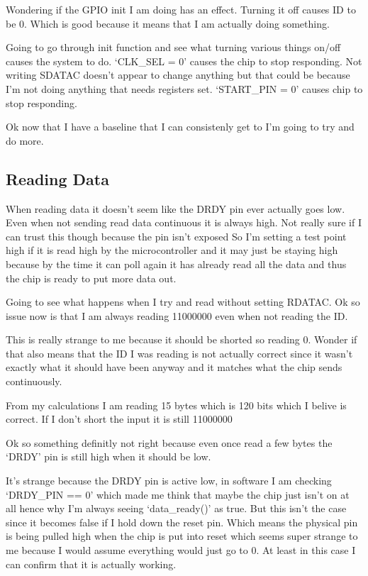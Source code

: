 Wondering if the GPIO init I am doing has an effect. Turning it off causes ID to be 0.
Which is good because it means that I am actually doing something.

Going to go through init function and see what turning various things on/off
causes the system to do.
`CLK\_SEL = 0' causes the chip to stop responding.
Not writing SDATAC doesn't appear to change anything but that could be because I'm not
doing anything that needs registers set.
`START\_PIN = 0' causes chip to stop responding.

Ok now that I have a baseline that I can consistenly get to I'm going to try and do more.


\subsection{Reading Data}
When reading data it doesn't seem like the DRDY pin ever actually goes low.
Even when not sending read data continuous it is always high.
Not really sure if I can trust this though because the pin isn't exposed
So I'm setting a test point high if it is read high by the microcontroller and it may
just be staying high because by the time it can poll again it has already read all the data
and thus the chip is ready to put more data out.

Going to see what happens when I try and read without setting RDATAC.
Ok so issue now is that I am always reading 11000000 even when not reading the ID.

This is really strange to me because it should be shorted so reading 0.
Wonder if that also means that the ID I was reading is not actually correct since it wasn't
exactly what it should have been anyway and it matches what the chip sends continuously.

From my calculations I am reading 15 bytes which is 120 bits which I belive is correct.
If I don't short the input it is still 11000000

Ok so something definitly not right because even once read a few bytes the `DRDY'
pin is still high when it should be low.

It's strange because the DRDY pin is active low, in software I am checking `DRDY\_PIN == 0'
which made me think that maybe the chip just isn't on at all hence why I'm always seeing
`data\_ready()' as true.
But this isn't the case since it becomes false if I hold down the reset pin.
Which means the physical pin is being pulled high when the chip is put into reset which
seems super strange to me because I would assume everything would just go to 0.
At least in this case I can confirm that it is actually working.

